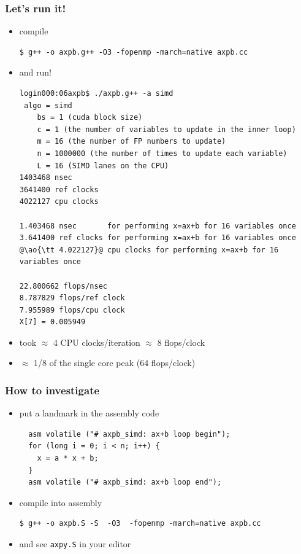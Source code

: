 \documentclass[12pt,dvipdfmx]{beamer}
\newcommand{\ao}[1]{{\color{blue}#1}}
\newcommand{\aka}[1]{{\color{red}#1}}
\begin{document}
\begin{frame}[fragile]
\frametitle{Let's run it!}
\begin{itemize}
\item<1-> compile
\begin{lstlisting}
$ g++ -o axpb.g++ -O3 -fopenmp -march=native axpb.cc
\end{lstlisting} %
\item<2-> and run!
\begin{lstlisting}
login000:06axpb$ ./axpb.g++ -a simd
 algo = simd
    bs = 1 (cuda block size)
    c = 1 (the number of variables to update in the inner loop)
    m = 16 (the number of FP numbers to update)
    n = 1000000 (the number of times to update each variable)
    L = 16 (SIMD lanes on the CPU)
1403468 nsec
3641400 ref clocks
4022127 cpu clocks

1.403468 nsec       for performing x=ax+b for 16 variables once
3.641400 ref clocks for performing x=ax+b for 16 variables once
@\ao{\tt 4.022127}@ cpu clocks for performing x=ax+b for 16 variables once

22.800662 flops/nsec
8.787829 flops/ref clock
7.955989 flops/cpu clock
X[7] = 0.005949
\end{lstlisting} %

\item<3-> took $\approx$ 4 CPU clocks/iteration
  $\approx$ \ao{8} flops/clock
\item<4-> $\approx$ \aka{1/8} of the single core peak (\ao{64} flops/clock)
\end{itemize}
\end{frame}

\begin{frame}[fragile]
\frametitle{How to investigate}
\begin{itemize}
\item<1-> put a landmark in the assembly code
\begin{lstlisting}
  asm volatile ("# axpb_simd: ax+b loop begin");
  for (long i = 0; i < n; i++) {
    x = a * x + b;
  }
  asm volatile ("# axpb_simd: ax+b loop end");
\end{lstlisting}
\item<2-> compile into assembly
\begin{lstlisting}
$ g++ -o axpb.S -S  -O3  -fopenmp -march=native axpb.cc    
\end{lstlisting} %
\item<2-> and see {\tt axpy.S} in your editor
\end{itemize}
\end{frame}
\fi
\end{document}

